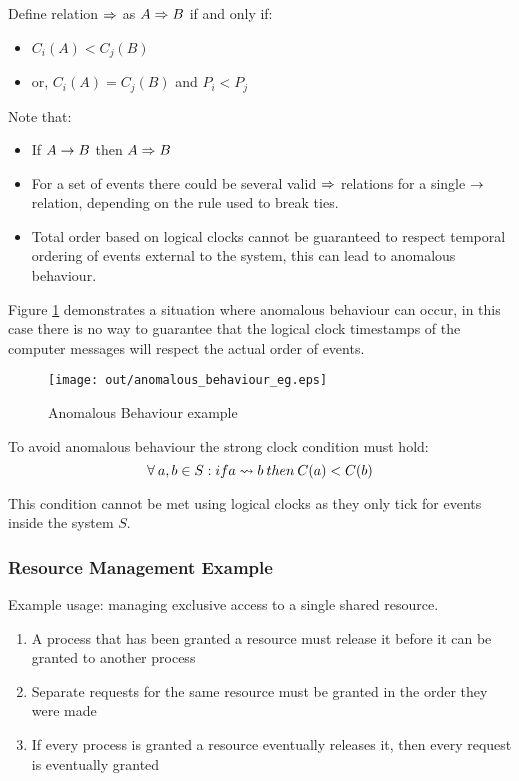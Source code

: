 \documentclass[a4paper]{article}
\begin{document}
Define relation $\Rightarrow$ as $A \Rightarrow B$ if and only if:

\begin{itemize}
  \item $C_{i}(A) < C_{j}(B)$
  \item or, $C_{i}(A) = C_{j}(B)$ and $P_{i} < P_{j}$
\end{itemize}

Note that:

\begin{itemize}
  \item If $A \rightarrow B$ then $A \Rightarrow B$
  \item For a set of events there could be several valid $\Rightarrow$
        relations for a single $\rightarrow$ relation, depending on the rule
        used to break ties.
  \item Total order based on logical clocks cannot be guaranteed to respect
        temporal ordering of events external to the system, this can lead to
        anomalous behaviour.
\end{itemize}

Figure \ref{fig:anomalous_behaviour_eg} demonstrates a situation where anomalous
behaviour can occur, in this case there is no way to guarantee that the logical
clock timestamps of the computer messages will respect the actual order of
events.

\begin{figure}[h!]
  \centering
  \texttt{[image: out/anomalous\_behaviour\_eg.eps]}
  \caption{Anomalous Behaviour example}
  \label{fig:anomalous_behaviour_eg}
\end{figure}
\FloatBarrier

To avoid anomalous behaviour the strong clock condition must hold:
\[
  \forall \: a, b \in S: if a \leadsto b \: then \: C(a) < C(b)
\]

This condition cannot be met using logical clocks as they only tick for events
inside the system $S$.

\subsubsection{Resource Management Example}

Example usage: managing exclusive access to a single shared resource.


\begin{enumerate}
  \item[1] A process that has been granted a resource must release it before it
           can be granted to another process
  \item[2] Separate requests for the same resource must be granted in the order
           they were made
  \item[3] If every process is granted a resource eventually releases it, then
           every request is eventually granted
\end{enumerate}
\end{document}
